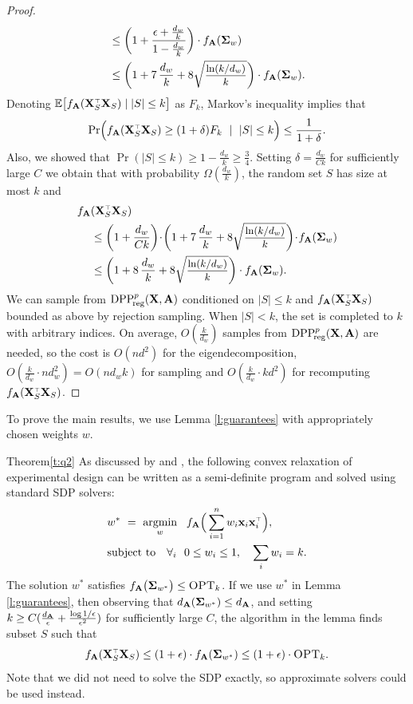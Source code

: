 \documentclass[thesis.tex]{subfiles}
\begin{document}
\begin{proof}
\begin{align*}
  &\leq
  \bigg(1+\frac{\epsilon+\frac{d_w}k}{1-\frac{d_w}k}\bigg)\cdot
f_{\A}(\Sigmab_w)
\\ &\leq \bigg(1+7\,\frac{d_w}{k} +
  8\sqrtshort{\frac{\ln(k/d_w)}{k}}\bigg)\cdot f_{\A}(\Sigmab_w).
\end{align*}
Denoting $\E\big[f_{\A}(\X_S^\top\X_S)\mid |S|\leq k\big]$ as $F_k$,
Markov's inequality implies that
\[\Pr\Big(f_{\A}(\X_S^\top\X_S) \geq
  (1+\delta) F_k\ \mid\ |S|\leq k\Big)\leq \frac1{1+\delta}.\]
Also, we showed
that $\Pr(|S|\leq k)\geq 1-\frac{d_w}{k}\geq \frac34$. Setting $\delta=\frac{d_w}{C
  k}$ for sufficiently large $C$ we obtain that with probability
$\Omega(\frac{d_w}{k})$, the random set $S$ has size at most $k$ and
\begin{align*}
f_{\A}&(\X_S^\top\X_S) \\
&\leq \bigg(1+\frac{d_w}{C k}\bigg)\!\cdot\! \bigg(1+7\,\frac{d_w}{k} +
  8\sqrtshort{\frac{\ln(k/d_w)}{k}}\bigg)\!\cdot\! f_{\A}(\Sigmab_w)\\
&\leq
\bigg(1+8\,\frac{d_w}{k} +
  8\sqrtshort{\frac{\ln(k/d_w)}{k}}\bigg)\cdot f_{\A}(\Sigmab_w).
\end{align*}
We can sample from ${{\mathrm{DPP}}_{\!\mathrm{reg}}^{p}}(\mathbf X,\mathbf A)$ conditioned on
$|S|\leq k$ and $f_{\A}(\X_S^\top\X_S)$ bounded as above by rejection
sampling. When $|S|<k$,  the set is completed to
$k$ with arbitrary indices. On average, $O(\frac k{d_w})$ samples from
${{\mathrm{DPP}}_{\!\mathrm{reg}}^{p}}(\mathbf X,\mathbf A)$ are needed, so the cost is $O(nd^2)$ for the
eigendecomposition, $O(\frac{k}{d_w}\cdot nd_w^2)=O(nd_wk)$ for
sampling and $O(\frac k{d_w}\cdot kd^2)$ for recomputing $f_{\A}(\X_S^\top\X_S)$.
\end{proof}
To prove the main results, we use Lemma \ref{l:guarantees} with
appropriately chosen weights $w$.
\begin{proofof}{Theorem}{\ref{t:q2}}
  As discussed by \cite{near-optimal-design} and
  \cite{boyd2004convex}, the following convex 
relaxation of experimental design can be written as a semi-definite
program and solved using standard SDP solvers:
\begin{align}
  &w^* \ = \  \argmin_w\ \
  f_{\A}\Big(\sum_{i=1}^nw_i\x_i\x_i^\top\Big),\quad\\
  &\text{subject to}\quad
  \forall_i\ \ 0\leq w_i\leq 1,\quad \sum_i w_i=k.\label{eq:sdp}
\end{align}
The solution $w^*$ satisfies $f_{\mathbf A}\big(\mathbf{\Sigma}_{w^*}\big)\leq
{\textsc{OPT}_k}$. If we use $w^*$ in Lemma \ref{l:guarantees}, then observing
that $d_{\mathbf A}(\mathbf{\Sigma}_{w^*})\leq d_{\mathbf A}$, and setting $k\geq C(\frac
{d_{\mathbf A}}{\epsilon} + \frac{\log1/\epsilon}{\epsilon^2})$ for
sufficiently large $C$, the algorithm in the lemma finds subset $S$
such that
\[f_{\A}(\X_S^\top\X_S)\leq (1+\epsilon)\cdot
f_{\A}(\Sigmab_{w^*})\leq
(1+\epsilon)\cdot\opt.\]
Note that we did not need to
solve the SDP exactly, so approximate solvers could be used instead.
\end{proofof}
\end{document}
